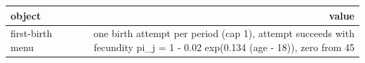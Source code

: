 \begingroup\small
\setlength{\tabcolsep}{3pt}
\renewcommand{\arraystretch}{1.04}
\begin{tabularx}{\linewidth}{Xr}
\toprule
object & value \\
\midrule
first-birth menu & one birth attempt per period (cap 1), attempt succeeds with fecundity pi\_j = 1 - 0.02 exp(0.134 (age - 18)), zero from 45 \\
\bottomrule
\end{tabularx}
\endgroup

